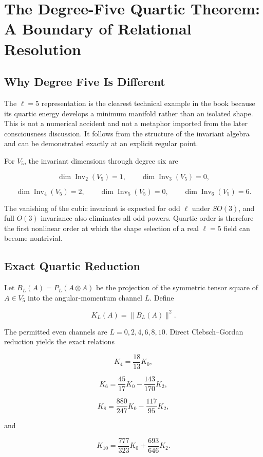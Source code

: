 \chapter[Degree-Five Quartic Theorem]{The Degree-Five Quartic Theorem: A Boundary of Relational Resolution}

\section{Why Degree Five Is Different}

The $\ell=5$ representation is the clearest technical example in the book because its quartic energy develops a minimum manifold rather than an isolated shape. This is not a numerical accident and not a metaphor imported from the later consciousness discussion. It follows from the structure of the invariant algebra and can be demonstrated exactly at an explicit regular point.

For $V_5$, the invariant dimensions through degree six are

\[
\dim\operatorname{Inv}_2(V_5)=1,
\qquad
\dim\operatorname{Inv}_3(V_5)=0,
\]

\[
\dim\operatorname{Inv}_4(V_5)=2,
\qquad
\dim\operatorname{Inv}_5(V_5)=0,
\qquad
\dim\operatorname{Inv}_6(V_5)=6.
\]

The vanishing of the cubic invariant is expected for odd $\ell$ under $SO(3)$, and full $O(3)$ invariance also eliminates all odd powers. Quartic order is therefore the first nonlinear order at which the shape selection of a real $\ell=5$ field can become nontrivial.

\section{Exact Quartic Reduction}

Let $B_L(A)=P_L(A\otimes A)$ be the projection of the symmetric tensor square of $A\in V_5$ into the angular-momentum channel $L$. Define

\[
K_L(A)=\|B_L(A)\|^2.
\]

The permitted even channels are $L=0,2,4,6,8,10$. Direct Clebsch--Gordan reduction yields the exact relations

\[
K_4=\frac{18}{13}K_0,
\]

\[
K_6=\frac{45}{17}K_0-\frac{143}{170}K_2,
\]

\[
K_8=\frac{880}{247}K_0-\frac{117}{95}K_2,
\]

and

\[
K_{10}=\frac{777}{323}K_0+\frac{693}{646}K_2.
\]

